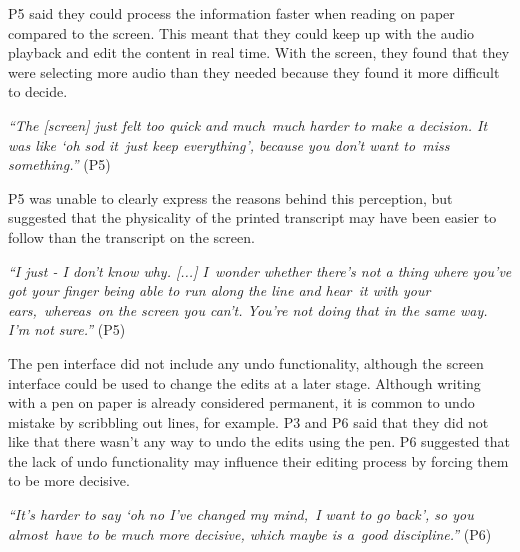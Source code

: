 P5 said they could process the information faster when reading on paper compared to the screen. This meant that they
could keep up with the audio playback and edit the content in real time. With the screen, they found that they were
selecting more audio than they needed because they found it more difficult to decide.

\textit{``The [screen] just felt too quick and much much harder to make a decision. It was like `oh sod it just keep
everything', because you don't want to miss something.''} (P5)

P5 was unable to clearly express the reasons behind this perception, but suggested that the physicality of the printed
transcript may have been easier to follow than the transcript on the screen.

\textit{``I just - I don't know why. [...] I wonder whether there's not a thing where you've got your finger being able
to run along the line and hear it with your ears, whereas on the screen you can't. You're not doing that in the same
way. I'm not sure.''} (P5) 

The pen interface did not include any undo functionality, although the screen interface could be used to change the
edits at a later stage. Although writing with a pen on paper is already considered permanent, it is common to undo
mistake by scribbling out lines, for example. P3 and P6 said that they did not like that there wasn't any way to undo
the edits using the pen. P6 suggested that the lack of undo functionality may influence their editing process by
forcing them to be more decisive.

\textit{``It's harder to say `oh no I've changed my mind, I want to go back', so you almost have to be much more
decisive, which maybe is a good discipline.''} (P6)




